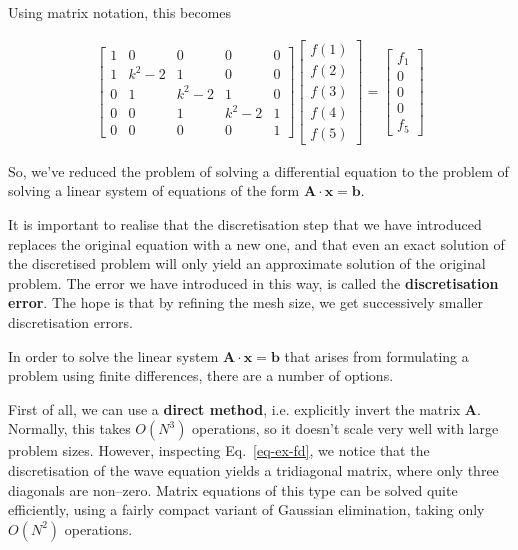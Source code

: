 Using matrix notation, this becomes

\begin{gather}
\begin{bmatrix}
1& 0& 0& 0& 0 \\
1& k^2-2& 1& 0& 0 \\
0& 1& k^2-2& 1& 0  \\
0& 0& 1& k^2-2& 1  \\
0& 0& 0& 0& 1
\end{bmatrix}
\begin{bmatrix}
f(1) \\
f(2) \\
f(3) \\
f(4) \\
f(5)
\end{bmatrix}
= 
\begin{bmatrix}
f_1 \\
0 \\
0 \\
0 \\
f_5
\end{bmatrix} \label{eq-ex-fd}
\end{gather}

So, we've reduced the problem of solving a differential equation to the problem of solving a linear system of equations of the form ${\mathbf A}\cdot{\mathbf x}={\mathbf b}$.

It is important to realise that the discretisation step that we have introduced replaces the original equation with a new one, and that even an exact solution of the discretised problem will only yield an approximate solution of the original problem. The error we have introduced in this way, is called the \textbf{discretisation error}. The hope is that by refining the mesh size, we get successively smaller discretisation errors. 


\pagebreak




In order to solve the linear system ${\mathbf A}\cdot{\mathbf x}={\mathbf b}$ that arises from formulating a problem using finite differences, there are a number of options.

First of all, we can use a \textbf{direct method}, i.e. explicitly invert the matrix ${\mathbf A}$. Normally, this takes $O(N^3)$ operations, so it doesn't scale very well with large problem sizes. However, inspecting Eq.~\ref{eq-ex-fd}, we notice that the discretisation of the wave equation yields a tridiagonal matrix, where only three diagonals are non--zero. Matrix equations of this type can be solved quite efficiently, using a fairly compact variant of Gaussian elimination, taking only $O(N^2)$ operations.

